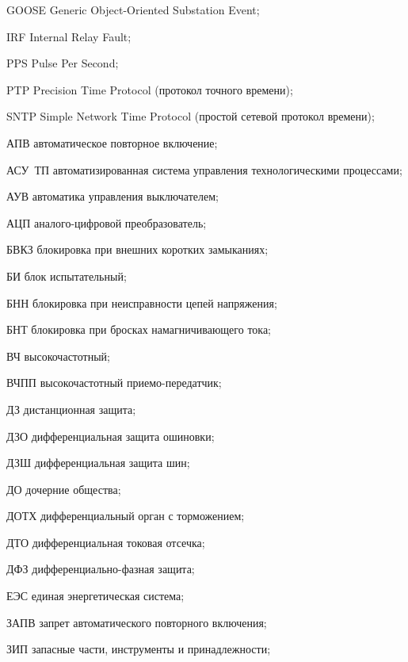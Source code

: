 \begin{list}{}%
{%
  \setlength{\labelwidth}{\abbrwidth}%
  \setlength{\labelsep}{0pt}%
  \setlength{\leftmargin}{\dimexpr\labelwidth+\labelsep\relax}%
  \setlength{\itemindent}{0pt}%
  \setlength{\parsep}{0pt}%
  \setlength{\itemsep}{0pt}
  \renewcommand{\makelabel}[1]{#1 --\hspace{\abbrgap}}%
}
\item[GOOSE] Generic Object-Oriented Substation Event;
\item[IRF] Internal Relay Fault;
\item[PPS] Pulse Per Second;
\item[PTP] Precision Time Protocol (протокол точного времени);
\item[SNTP] Simple Network Time Protocol (простой сетевой протокол времени);
\item[АПВ] автоматическое повторное включение;
\item[АСУ~ТП] автоматизированная система управления технологическими процессами;
\item[АУВ] автоматика управления выключателем;
\item[АЦП] аналого-цифровой преобразователь;
\item[БВКЗ] блокировка при внешних коротких замыканиях;
\item[БИ] блок испытательный;
\item[БНН] блокировка при неисправности цепей напряжения;
\item[БНТ] блокировка при бросках намагничивающего тока;
\item[ВЧ] высокочастотный;
\item[ВЧПП] высокочастотный приемо-передатчик;
\item[ДЗ] дистанционная защита;
\item[ДЗО] дифференциальная защита ошиновки;
\item[ДЗШ] дифференциальная защита шин;
\item[ДО] дочерние общества;
\item[ДОТХ] дифференциальный орган с торможением;
\item[ДТО] дифференциальная токовая отсечка;
\item[ДФЗ] дифференциально-фазная защита;
\item[ЕЭС] единая энергетическая система;
\item[ЗАПВ] запрет автоматического повторного включения;
\item[ЗИП] запасные части, инструменты и принадлежности;

\end{list}

